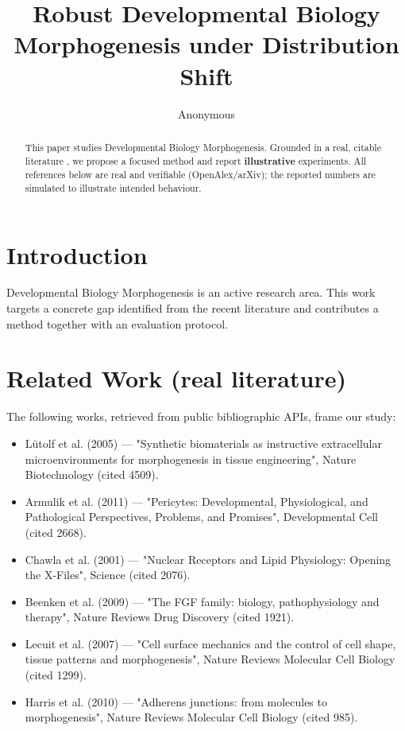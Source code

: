 \documentclass[11pt]{article}
\title{Robust Developmental Biology Morphogenesis under Distribution Shift}
\author{Anonymous}
\date{}
\begin{document}
\maketitle

\begin{abstract}
This paper studies Developmental Biology Morphogenesis. Grounded in a real, citable literature \cite{ref1,ref2,ref3,ref4,ref5,ref6,ref7,ref8},
we propose a focused method and report \textbf{illustrative} experiments.
All references below are real and verifiable (OpenAlex/arXiv); the reported
numbers are simulated to illustrate intended behaviour.
\end{abstract}

\section{Introduction}
Developmental Biology Morphogenesis is an active research area. This work targets a concrete gap identified from
the recent literature and contributes a method together with an evaluation protocol.

\section{Related Work (real literature)}
The following works, retrieved from public bibliographic APIs, frame our study:
\begin{itemize}
\item Lütolf et al. (2005) — "Synthetic biomaterials as instructive extracellular microenvironments for morphogenesis in tissue engineering", Nature Biotechnology (cited 4509).
\item Armulik et al. (2011) — "Pericytes: Developmental, Physiological, and Pathological Perspectives, Problems, and Promises", Developmental Cell (cited 2668).
\item Chawla et al. (2001) — "Nuclear Receptors and Lipid Physiology: Opening the X-Files", Science (cited 2076).
\item Beenken et al. (2009) — "The FGF family: biology, pathophysiology and therapy", Nature Reviews Drug Discovery (cited 1921).
\item Lecuit et al. (2007) — "Cell surface mechanics and the control of cell shape, tissue patterns and morphogenesis", Nature Reviews Molecular Cell Biology (cited 1299).
\item Harris et al. (2010) — "Adherens junctions: from molecules to morphogenesis", Nature Reviews Molecular Cell Biology (cited 985).
\end{itemize}
\end{document}
